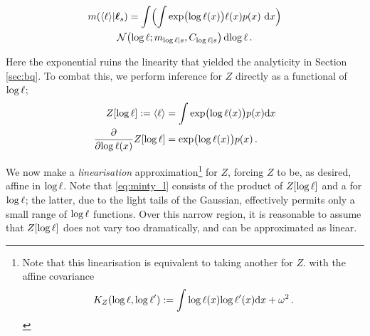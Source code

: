 \documentclass{article}
\begin{document}
%
%
%
\begin{multline}\label{eq:minty_l}
\mean{\inty{\lfn}}{\vr_s}
 =\int \Bigl( \int \exp\bigl(\tr(\lfv)\bigr)\lfn(\lfv)\po{\lfv}\,\ud\lfv\Bigr)\\
\N{\tr}{\meancondfn{\tr}{s}}{C_{\tr|s}} \ud \tr\,.
\end{multline}

Here the exponential ruins the linearity that yielded the analyticity in Section \ref{sec:bq}. To combat this, we perform inference for $Z$ directly as a functional of $\tr$;
%
\begin{align*}
 Z[\tr] \deq \inty{\lfn} & = \int \exp \bigl( \tr(\lfv)\bigr) p(\lfv) \ud \lfv\\
\pderiv{}{\tr(\lfv)}Z[\tr] & = \exp \bigl( \tr(\lfv)\bigr) p(\lfv) %
\,.
\end{align*}

We now make a \emph{linearisation} approximation\footnote{Note that this linearisation is equivalent to taking another \gpb for $Z$. with the affine covariance
\begin{equation*}
 K_Z(\tr,\tr')
\deq
\int\tr(\lfv) \tr'(\lfv) \ud \lfv
+ \omega^2\,.
\end{equation*}
} 
for $Z$, forcing $Z$ to be, as desired, affine in $\tr$. 
Note that \eqref{eq:minty_l} consists of the product of $Z[\tr]$ and a \gpb for $\tr$; the latter, due to the light tails of the Gaussian, effectively permits only a small range of $\tr$ functions. Over this narrow region, it is reasonable to assume that $Z[\tr]$ does not vary too dramatically, and can be approximated as linear. 
\end{document}
